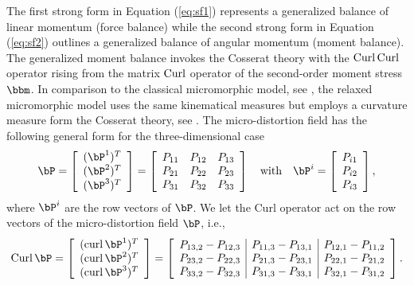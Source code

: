 The first strong form in Equation (\ref{eq:sf1}) represents a generalized balance of linear momentum (force balance) while the second strong form in Equation (\ref{eq:sf2}) outlines a generalized balance of angular momentum (moment balance). The generalized moment balance invokes the Cosserat theory with the $\operatorname{Curl} \operatorname{Curl}$ operator rising from the matrix $\operatorname{Curl}$ operator of the second-order moment stress $\bbm$.  In comparison to the classical micromorphic model, see \cite{Eri:1968:mom,NefGhiMadPlaRos:2014:aup}, the relaxed micromorphic model uses the same kinematical measures but employs a curvature measure form the Cosserat theory, see \cite{NefJeoMueRam:2010:lce}. The micro-distortion field has the following general form for the three-dimensional case
 \begin{equation}
\Bdis = \left[ \begin{array}{c}
(\Bdis^{1})^T \\
(\Bdis^{2})^T \\
(\Bdis^{3})^T \\
\end{array}\right] = \left[\begin{array}{c c c}
 \dis_{11}  &  \dis_{12}  & \dis_{13}  \\   
 \dis_{21}  &  \dis_{22}  & \dis_{23}  \\ 
 \dis_{31}  &  \dis_{32}  & \dis_{33}  \\ 
\end{array}\right] \quad \textrm{with} \quad \Bdis^{i} = \left[ \begin{array}{c}
\dis_{i1} \\
\dis_{i2} \\ 
\dis_{i3}
\end{array} \right],
 \end{equation}
where $\Bdis^{i}$  are the row vectors of $\Bdis$. 
We let the Curl operator act on the row vectors of the micro-distortion field $\Bdis$, i.e.,
 \begin{equation}
\Curl \Bdis = \left[ \begin{array}{c}
(\curl \Bdis^{1})^T \\
(\curl \Bdis^{2})^T \\
(\curl \Bdis^{3})^T \\
\end{array}\right] = \left[\begin{array}{c|c|c}
 \dis_{13,2} - \dis_{12,3}	& \dis_{11,3} - \dis_{13,1}  &  \dis_{12,1} - \dis_{11,2} \\
 \dis_{23,2} - \dis_{22,3}	& \dis_{21,3} - \dis_{23,1}  &  \dis_{22,1} - \dis_{21,2} \\
 \dis_{33,2} - \dis_{32,3}	& \dis_{31,3} - \dis_{33,1}  &  \dis_{32,1} - \dis_{31,2} 
\end{array}\right].
 \end{equation}
